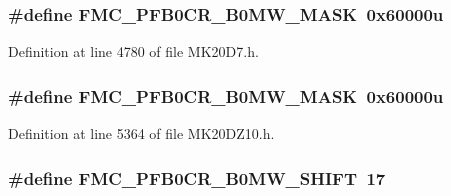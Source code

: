 \subsubsection[{\texorpdfstring{F\+M\+C\+\_\+\+P\+F\+B0\+C\+R\+\_\+\+B0\+M\+W\+\_\+\+M\+A\+SK}{FMC_PFB0CR_B0MW_MASK}}]{\setlength{\rightskip}{0pt plus 5cm}\#define F\+M\+C\+\_\+\+P\+F\+B0\+C\+R\+\_\+\+B0\+M\+W\+\_\+\+M\+A\+SK~0x60000u}\hypertarget{group___f_m_c___register___masks_gac03a4c507c37a0a18312d87c64e1ec5d}{}\label{group___f_m_c___register___masks_gac03a4c507c37a0a18312d87c64e1ec5d}


Definition at line 4780 of file M\+K20\+D7.\+h.

\subsubsection[{\texorpdfstring{F\+M\+C\+\_\+\+P\+F\+B0\+C\+R\+\_\+\+B0\+M\+W\+\_\+\+M\+A\+SK}{FMC_PFB0CR_B0MW_MASK}}]{\setlength{\rightskip}{0pt plus 5cm}\#define F\+M\+C\+\_\+\+P\+F\+B0\+C\+R\+\_\+\+B0\+M\+W\+\_\+\+M\+A\+SK~0x60000u}\hypertarget{group___f_m_c___register___masks_gac03a4c507c37a0a18312d87c64e1ec5d}{}\label{group___f_m_c___register___masks_gac03a4c507c37a0a18312d87c64e1ec5d}


Definition at line 5364 of file M\+K20\+D\+Z10.\+h.

\subsubsection[{\texorpdfstring{F\+M\+C\+\_\+\+P\+F\+B0\+C\+R\+\_\+\+B0\+M\+W\+\_\+\+S\+H\+I\+FT}{FMC_PFB0CR_B0MW_SHIFT}}]{\setlength{\rightskip}{0pt plus 5cm}\#define F\+M\+C\+\_\+\+P\+F\+B0\+C\+R\+\_\+\+B0\+M\+W\+\_\+\+S\+H\+I\+FT~17}\hypertarget{group___f_m_c___register___masks_gacfb3dd701c01e307d578e1fd0d048149}{}\label{group___f_m_c___register___masks_gacfb3dd701c01e307d578e1fd0d048149}


